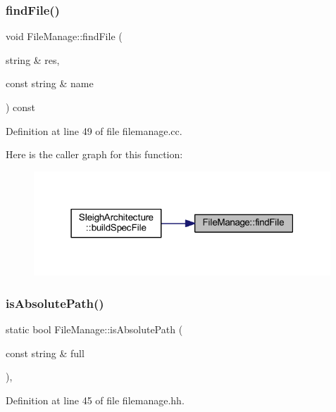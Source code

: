 \subsubsection{\texorpdfstring{findFile()}{findFile()}}
{\footnotesize\ttfamily void File\+Manage\+::find\+File (\begin{DoxyParamCaption}\item[{string \&}]{res,  }\item[{const string \&}]{name }\end{DoxyParamCaption}) const}



Definition at line 49 of file filemanage.\+cc.

Here is the caller graph for this function\+:
\nopagebreak
\begin{figure}[H]
\begin{center}
\leavevmode
\includegraphics[width=316pt]{class_file_manage_abc430305a56bcf90db9eca772676b3a6_icgraph}
\end{center}
\end{figure}
\mbox{\label{class_file_manage_a04c3c512ed3ab22194c34729dd2dd20e}} 
\subsubsection{\texorpdfstring{isAbsolutePath()}{isAbsolutePath()}}
{\footnotesize\ttfamily static bool File\+Manage\+::is\+Absolute\+Path (\begin{DoxyParamCaption}\item[{const string \&}]{full }\end{DoxyParamCaption})\hspace{0.3cm}{\ttfamily [inline]}, {\ttfamily [static]}}



Definition at line 45 of file filemanage.\+hh.


